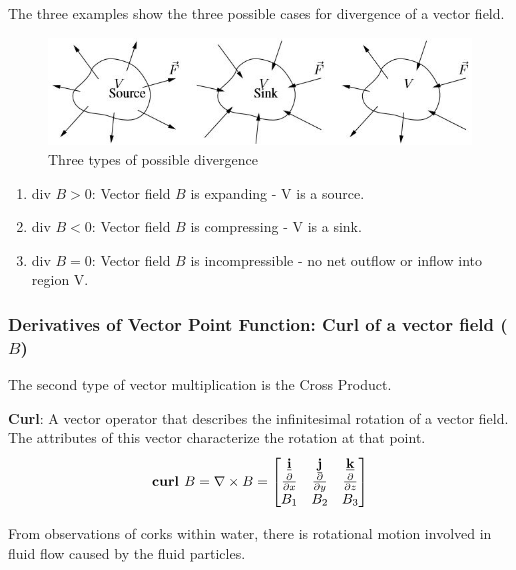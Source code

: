 \documentclass[10pt,a4paper]{article}
\begin{document}
The three examples show the three possible cases for divergence of a vector field.
\begin{figure} [h!]
    \centering
    \includegraphics[scale=0.7]{Three.JPG}
    \caption{Three types of possible divergence}
\end{figure}
\begin{enumerate}
    \item div $B > 0$: Vector field $B$ is expanding - V is a source.
    \item div $B < 0$: Vector field $B$ is compressing - V is a sink.
    \item div $B = 0$: Vector field $B$ is incompressible - no net outflow or inflow into region V.
\end{enumerate}

\subsubsection{Derivatives of Vector Point Function: Curl of a vector field ($B$)}

The second type of vector multiplication is the Cross Product. 

\begin{tcolorbox}[breakable,colback=white]
    \textbf{Curl}: A vector operator that describes the infinitesimal rotation of a vector field. The attributes of this vector characterize the rotation at that point.
    $$
        \textbf{curl }B = \nabla \times B = \begin{bmatrix}
            \textbf{\underline{i}} & \textbf{\underline{j}} & \textbf{\underline{k}} \\
            \frac{\partial}{\partial x} & \frac{\partial}{\partial y} & \frac{\partial}{\partial z} \\
            B_1 & B_2 & B_3
        \end{bmatrix}
    $$
\end{tcolorbox}

From observations of corks within water, there is rotational motion involved in fluid flow
caused by the fluid particles.
\end{document}
